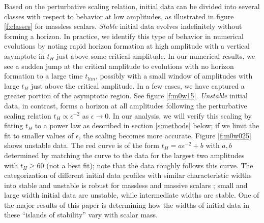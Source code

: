 \documentclass[../PhD.tex]{subfiles}
\begin{document}
Based on the perturbative scaling relation,
initial data can be divided into several classes with respect
to behavior at low amplitudes, as illustrated in figure \ref{f:classes}
for massless scalars.  \textit{Stable} initial data evolves
indefinitely without forming a horizon.  In practice, we identify this
type of behavior in numerical evolutions by noting rapid horizon formation
at high amplitude with a vertical asymptote in $t_H$ just above some
critical amplitude.  In our numerical results, we see
a sudden jump at the critical amplitude to evolutions with no horizon formation
to a large time $t_{lim}$, possibly with a small
window of amplitudes with large $t_H$ just above the critical amplitude.
In a few cases, we have captured a greater portion of the asymptotic region.
See figure \ref{f:m0w15}.
\textit{Unstable} initial data, in contrast, forms a horizon at all
amplitudes following the perturbative scaling relation $t_H\propto \epsilon^{-2}$
as $\epsilon\to 0$. In our analysis, we will verify this scaling by
fitting $t_H$ to a power law as
described in section \ref{s:methods} below; if we limit the fit to smaller
values of $\epsilon$, the scaling becomes more accurate.  Figure \ref{f:m0w025}
shows unstable data. The red curve is of the form $t_H=a\epsilon^{-2}+b$
with $a,b$ determined by matching the curve to the data for the largest
two amplitudes with $t_H\geq 60$ (not a best fit); note that the data
roughly follows this curve.
The categorization of different initial data profiles with similar
characteristic widths into stable and unstable is robust for massless and
massive scalars \cite{1508.02709}; small and large width initial data are
unstable, while intermediate widths are stable.  One of the major results
of this paper is determining how the widths of initial data in these
``islands of stability'' vary with scalar mass.
\end{document}
